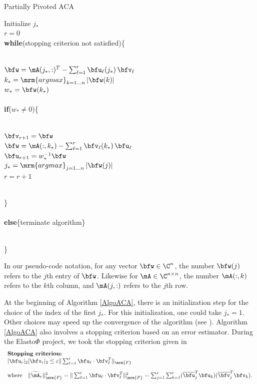\begin{algorithm}
  \caption{Partially Pivoted ACA}  
  \label{AlgoACA}
  Initialize $j_{*}$\\
  $r=0$\\
  \textbf{while}(stopping criterion not satisfied)\{\\\quad\\
  \indent\hspace{0.5cm} \parbox{\linewidth}{
    $\bfw = \mA(j_{*},:)^{T} - \sum_{\ell=1}^{r}\bfu_{\ell}(j_{*})\,\bfv_{\ell}$\\
    $k_{*} = \mathop{\mrm{argmax}}_{k = 1\dots n}\vert \bfw(k)\vert$\\
    $w_{*} = \bfw(k_{*})$\\\quad\\
    \textbf{if}($w_{*}\neq 0$)\{\\\quad\\
    \indent\hspace{0.5cm} \parbox{\linewidth}{
      $\bfv_{r+1} = \bfw$\\
      $\bfw = \mA(:,k_{*})-\sum_{\ell = 1}^{r}\bfv_{\ell}(k_{*})\,\bfu_{\ell} $\\
      $\bfu_{r+1} = w_{*}^{-1}\bfw$\\      
      $j_{*} = \mathop{\mrm{argmax}}_{j = 1\dots n} \vert \bfw(j)\vert$\\
      $r=r+1$
    }
    \quad\\
    \}\\\quad\\
    \textbf{else}\{terminate algorithm\}
    }\\
  \}

\end{algorithm}

\bigskip
In our pseudo-code notation, for any vector $\bfw\in \C^{n}$, the number $\bfw(j)$  refers to the $j$th entry of $\bfw$. 
Likewise for $\mA\in \C^{n\times n}$, the number $\mA(:,k)$ refers to the $k$th column, and $\mA(j,:)$ refers to the $j$th
row.

\bigskip
At the beginning of Algorithm \ref{AlgoACA}, there is an initialization step for the choice of the index of the first $j_{*}$. 
For this initialization, one could take $j_{*} = 1$. Other choices may speed up the convergence of the algorithm (see \cite[Section 3.4.3]{Bebendorf2008}). Algorithm \ref{AlgoACA} also involves a stopping criterion based on an error estimator. During the Elasto$\Phi$ 
project, we took the stopping criterion given in \cite{Rjasanow2007}
$$
\begin{array}{l}
\textbf{Stopping criterion:}\\ 
\vert \bfu_{r}\vert_{2}\vert \bfv_{r}\vert_{2}\leq  \varepsilon\Vert \sum_{\ell = 1}^{r}\bfu_{\ell}\cdot\bfv_{\ell}^{T}\Vert_{\mrm{F}}\\[10pt]
\textrm{where}\quad \Vert \widetilde{\mA}_{r} \Vert_{\mrm{F}}^2 =  \Vert \sum_{\ell = 1}^{r}\bfu_{\ell}\cdot\bfv_{\ell}^{T}\Vert_{\mrm{F}}^{2} = \sum_{j=1}^{r}\sum_{k=1}^{r}
(\overline{\bfu}_{j}^{T}\bfu_{k})(\overline{\bfv}_{j}^{T}\bfv_{k}).
\end{array}
$$

